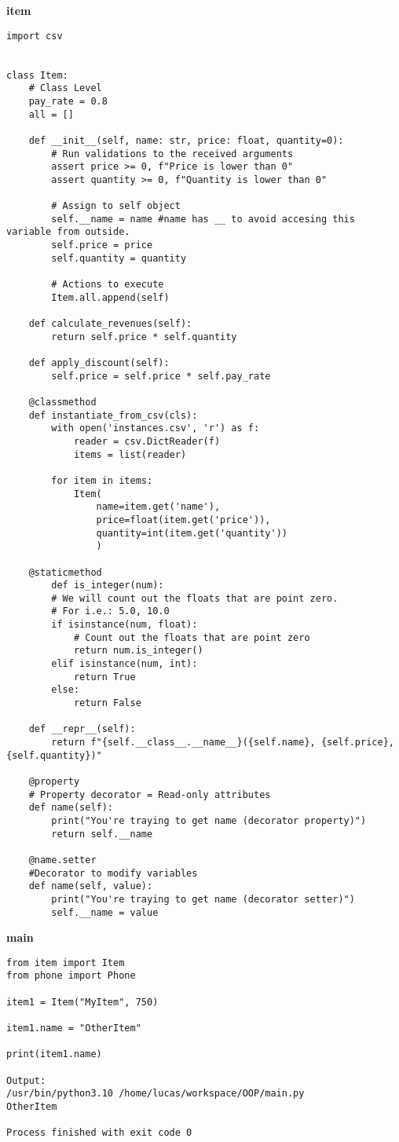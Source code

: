 \documentclass{article}
\begin{document}
\textbf{item}

\begin{lstlisting}
import csv


class Item:
	# Class Level
	pay_rate = 0.8
	all = []
	
	def __init__(self, name: str, price: float, quantity=0):
		# Run validations to the received arguments
		assert price >= 0, f"Price is lower than 0"
		assert quantity >= 0, f"Quantity is lower than 0"
		
		# Assign to self object
		self.__name = name #name has __ to avoid accesing this variable from outside.
		self.price = price
		self.quantity = quantity
		
		# Actions to execute
		Item.all.append(self)
	
	def calculate_revenues(self):
		return self.price * self.quantity
	
	def apply_discount(self):
		self.price = self.price * self.pay_rate
	
	@classmethod
	def instantiate_from_csv(cls):
		with open('instances.csv', 'r') as f:
			reader = csv.DictReader(f)
			items = list(reader)
		
		for item in items:
			Item(
				name=item.get('name'),
				price=float(item.get('price')),
				quantity=int(item.get('quantity'))
				)
		
	@staticmethod
		def is_integer(num):
		# We will count out the floats that are point zero.
		# For i.e.: 5.0, 10.0
		if isinstance(num, float):
			# Count out the floats that are point zero
			return num.is_integer()
		elif isinstance(num, int):
			return True
		else:
			return False
	
	def __repr__(self):
		return f"{self.__class__.__name__}({self.name}, {self.price}, {self.quantity})"
	
	@property
	# Property decorator = Read-only attributes
	def name(self):
		print("You're traying to get name (decorator property)")
		return self.__name
	
	@name.setter
	#Decorator to modify variables
	def name(self, value):
		print("You're traying to get name (decorator setter)")
		self.__name = value

\end{lstlisting}

\textbf{main}

\begin{lstlisting}
from item import Item
from phone import Phone

item1 = Item("MyItem", 750)

item1.name = "OtherItem"

print(item1.name)

Output:
/usr/bin/python3.10 /home/lucas/workspace/OOP/main.py 
OtherItem

Process finished with exit code 0

\end{lstlisting}
\end{document}
